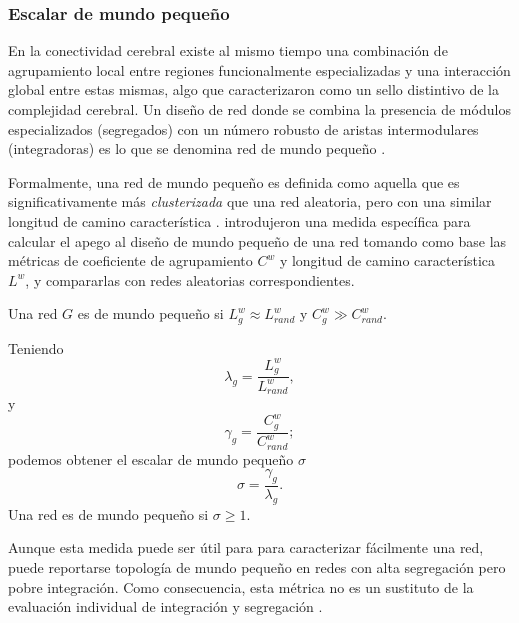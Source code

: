 \subsubsection{Escalar de mundo pequeño}
En la conectividad cerebral existe al mismo tiempo una combinación de agrupamiento local entre regiones funcionalmente especializadas y una interacción global entre estas mismas, algo que \textcite{Tononi1994} caracterizaron como un sello distintivo de la complejidad cerebral.
Un diseño de red donde se combina la presencia de módulos especializados (segregados) con un número robusto de aristas intermodulares (integradoras) es lo que se denomina red de mundo pequeño \parencite{Rubinov2010}. \par
Formalmente, una red de mundo pequeño es definida como aquella que es significativamente más \textit{clusterizada} que una red aleatoria, pero con una similar longitud de camino característica \parencite{Watts1998}.
\textcite{Humphries2008} introdujeron una medida específica para calcular el apego al diseño de mundo pequeño de una red tomando como base las métricas de coeficiente de agrupamiento $C^w$ y longitud de camino característica $L^w$, y compararlas con redes aleatorias correspondientes.\par
Una red $G$ es de mundo pequeño si $L_g^w \approx L_{rand}^w$ y $C_g^w \gg C_{rand}^w$. \par
Teniendo
\begin{equation}\label{eqLambda}
    \lambda_g=\frac{L_g^w}{L_{rand}^w},
\end{equation}
y
\begin{equation}\label{eqGamma}
    \gamma_g=\frac{C_g^w}{C_{rand}^w};
\end{equation}
podemos obtener el escalar de mundo pequeño $\sigma$
\begin{equation}\label{eqSW}
    \sigma=\frac{\gamma_g}{\lambda_g}.
\end{equation}
Una red es de mundo pequeño si $\sigma \geq 1$.\par
Aunque esta medida puede ser útil para para caracterizar fácilmente una red, puede reportarse topología de mundo pequeño en redes con alta segregación pero pobre integración.
Como consecuencia, esta métrica no es un sustituto de la evaluación individual de integración y segregación \parencite{Rubinov2010}.

